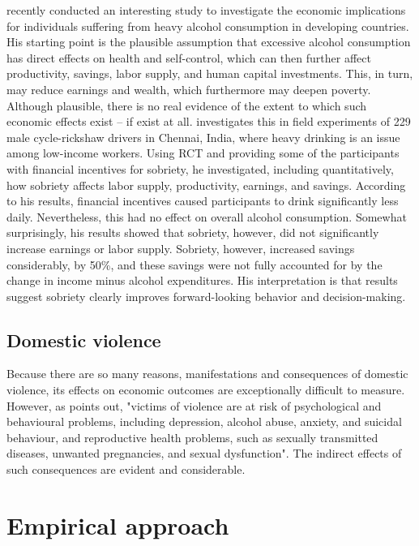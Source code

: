 \documentclass[12pt,a4paper,notitlepage]{article}
\begin{document}
\citet{Schilbach:2019} recently conducted an interesting study to investigate the economic implications for individuals suffering from heavy alcohol consumption in developing countries. His starting point is the plausible assumption that excessive alcohol consumption has direct effects on health and self-control, which can then further affect productivity, savings, labor supply, and human capital investments. This, in turn, may reduce earnings and wealth, which furthermore may deepen poverty. Although plausible, there is no real evidence of the extent to which such economic effects exist -- if exist at all. \citet{Schilbach:2019} investigates this in field experiments of 229 male cycle-rickshaw drivers in Chennai, India, where heavy drinking is an issue among low-income workers. Using RCT and providing some of the participants with financial incentives for sobriety, he investigated, including quantitatively, how sobriety affects labor supply, productivity, earnings, and savings. According to his results, financial incentives caused participants to drink significantly less daily. Nevertheless, this had no effect on overall alcohol consumption. Somewhat surprisingly, his results showed that sobriety, however, did not significantly increase earnings or labor supply. Sobriety, however, increased savings considerably, by 50\%, and these savings were not fully accounted for by the change in income minus alcohol expenditures. His interpretation is that results suggest sobriety clearly improves forward-looking behavior and decision-making.

\subsection{Domestic violence}

Because there are so many reasons, manifestations and consequences of domestic violence, its effects on economic outcomes are exceptionally difficult to measure. However, as \citet{Krug:2002} points out, "victims of violence are at risk of psychological and behavioural problems, including depression, alcohol abuse, anxiety, and suicidal behaviour, and reproductive health problems, such as sexually transmitted diseases, unwanted pregnancies, and sexual dysfunction". The indirect effects of such consequences are evident and considerable.

\newpage
\section{Empirical approach} \label{sec:empirical}
\end{document}

